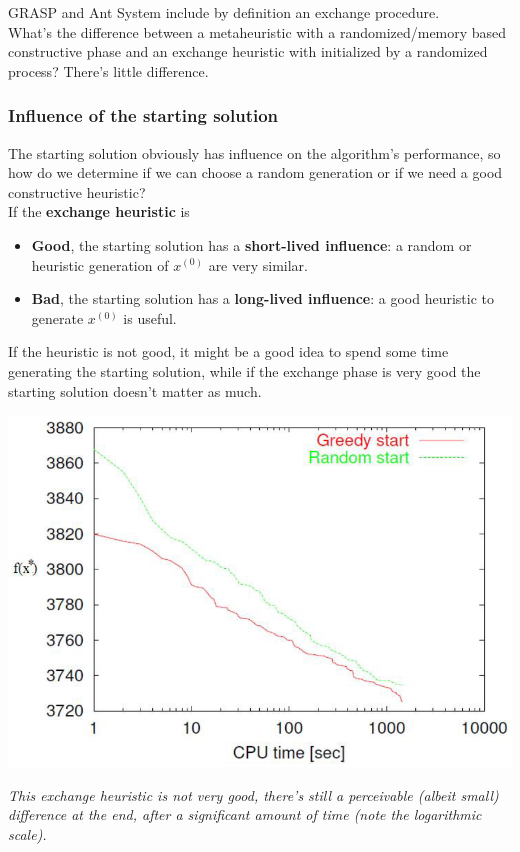 GRASP and Ant System include by definition an exchange procedure.\\

What's the difference between a metaheuristic with a randomized/memory based constructive phase and an exchange heuristic with initialized by a randomized process? There's little difference.\\

\newpage

\subsubsection{Influence of the starting solution}
The starting solution obviously has influence on the algorithm's performance, so how do we determine if we can choose a random generation or if we need a good constructive heuristic?\\

If the \textbf{exchange heuristic} is
\begin{itemize}
	\item \textbf{Good}, the starting solution has a \textbf{short-lived influence}: a random or heuristic generation of $x^{(0)}$ are very similar.\\
	
	\item \textbf{Bad}, the starting solution has a \textbf{long-lived influence}: a good heuristic to generate $x^{(0)}$ is useful.\\
\end{itemize}
If the heuristic is not good, it might be a good idea to spend some time generating the starting solution, while if the exchange phase is very good the starting solution doesn't matter as much.\\

\begin{center}
	\includegraphics[width=0.8\columnwidth]{img/influence1}
\end{center}
\textit{This exchange heuristic is not very good, there's still a perceivable (albeit small) difference at the end, after a significant amount of time (note the logarithmic scale).}

